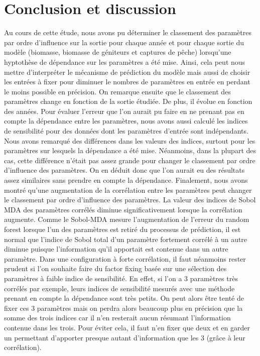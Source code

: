 \documentclass[
]{article}
\begin{document}
\hypertarget{conclusion-et-discussion}{%
\section{Conclusion et discussion}\label{conclusion-et-discussion}}

Au cours de cette étude, nous avons pu déterminer le classement des
paramètres par ordre d'influence sur la sortie pour chaque année et pour
chaque sortie du modèle (biomasse, biomasse de géniteurs et captures de
pêche) lorsqu'une hyptothèse de dépendance sur les paramètres a été
mise. Ainsi, cela peut nous mettre d'interpréter le mécanisme de
prédiction du modèle mais aussi de choisir les entrées à fixer pour
diminuer le nombres de paramètres en entrée en perdant le moins possible
en précision. On remarque ensuite que le classement des paramètres
change en fonction de la sortie étudiée. De plus, il évolue en fonction
des années. Pour évaluer l'erreur que l'on aurait pu faire en ne prenant
pas en compte la dépendance entre les paramètres, nous avons aussi
calculé les indices de sensibilité pour des données dont les paramètres
d'entrée sont indépendants. Nous avons remarqué des différences dans les
valeurs des indices, surtout pour les paramètres sur lesquels la
dépendance a été mise. Néanmoins, dans la plupart des cas, cette
différence n'était pas assez grande pour changer le classement par ordre
d'influence des paramètres. On en déduit donc que l'on aurait eu des
résultats assez similaires sans prendre en compte la dépendance.
Finalement, nous avons montré qu'une augmentation de la corrélation
entre les paramètres peut changer le classement par ordre d'influence
des paramètres. La valeur des indices de Sobol MDA des paramètres
corrélés diminue significativement lorsque la corrélation augmente.
Comme le Sobol-MDA mesure l'augmentation de l'erreur du random forest
lorsque l'un des paramètres est retiré du processus de prédiction, il
est normal que l'indice de Sobol total d'un paramètre fortement corrélé
à un autre diminue puisque l'information qu'il apportait est contenue
dans un autre paramètre. Dans une configuration à forte corrélation, il
faut néanmoins rester prudent si l'on souhaite faire du factor fixing
basée sur une sélection des paramètres à faible indice de sensibilité.
En effet, si l'on a 3 paramètres très corrélés par exemple, leurs
indices de sensibilité mesurés avec une méthode prenant en compte la
dépendance sont très petits. On peut alors être tenté de fixer ces 3
paramètres mais on perdra alors beaucoup plus en précision que la somme
des trois indices car il n'en resterait aucun résumant l'information
contenue dans les trois. Pour éviter cela, il faut n'en fixer que deux
et en garder un permettant d'apporter presque autant d'information que
les 3 (grâce à leur corrélation).
\end{document}
